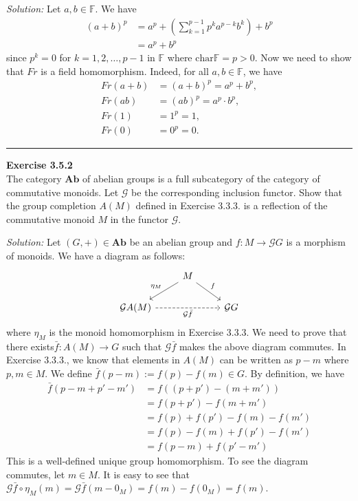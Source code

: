 \documentclass[a4paper, 12pt]{article}
\newenvironment{problem}[2][Exercise]
    { \begin{mdframed}[backgroundcolor=gray!20] \textbf{#1 #2} \\}
    {  \end{mdframed}}
\newenvironment{solution}
    {\textit{Solution:}}
    {}
\begin{document}
\begin{solution}
Let \(a,b\in \mathbb{F}\). We have 
\begin{align*}
	(a+b)^p & =a^p+(\sum_{k=1}^{p-1}p^k a^{p-k}b^k)+b^p\\ 
	        & =a^p+b^p
\end{align*}
since \(p^k=0\) for \(k=1,2,\ldots,p-1\) in \(\mathbb{F}\) where \(\text{char}\mathbb{F}=p>0\). Now we need to show that \(Fr\) is a field homomorphism. Indeed, for all \(a,b\in \mathbb{F}\), we have 
\begin{align*}
	Fr(a+b) & =(a+b)^p=a^p+b^p, \\ 
	Fr(ab) & =(ab)^p=a^p\cdot b^p, \\ 
	Fr(1) & =1^p=1, \\ 
	Fr(0) & =0^p=0. 
\end{align*}

\end{solution}

\noindent\rule{7in}{2.8pt}
\begin{problem}{3.5.2}
The category \(\mathbf{Ab}\) of abelian groups is a full subcategory of the category of commutative monoids. Let \(\mathcal{G}\) be the corresponding inclusion functor. Show that 
the group completion \(A(M)\) defined in Exercise 3.3.3. is a reflection of the commutative monoid \(M\) in the functor \(\mathcal{G}\).
\end{problem}
\begin{solution}
Let \((G,+)\in \mathbf{Ab}\) be an abelian group and \(f:M\rightarrow \mathcal{G}G\) is a morphism of monoids. We have a diagram as follows:
$$\begin{tikzcd}
	& M \\
	{\mathcal{G}A(M)} && {\mathcal{G}G}
	\arrow["{\eta_M}"', from=1-2, to=2-1]
	\arrow["f", from=1-2, to=2-3]
	\arrow["{\mathcal{G}\bar{f}}"', dashed, from=2-1, to=2-3]
\end{tikzcd}$$
where \(\eta_M\) is the monoid homomorphism in Exercise 3.3.3. We need to prove that there exists\(\bar{f}:A(M)\rightarrow G\) such that \(\mathcal{G}\bar{f}\) makes the above diagram commutes. 
In Exercise 3.3.3., we know that elements in \(A(M)\) can be written as \(p-m\) where \(p,m\in M\). We define \(\bar{f}(p-m):=f(p)-f(m)\in G\). By definition, we have 
\begin{align*}
	\bar{f}(p-m+p'-m') & =f((p+p')-(m+m'))\\ 
	             & =f(p+p')-f(m+m')\\ 
				 & =f(p)+f(p')-f(m)-f(m')\\ 
				 & =f(p)-f(m)+f(p')-f(m')\\ 
				 & =f(p-m)+f(p'-m')
\end{align*}
This is a well-defined unique group homomorphism. To see the diagram commutes, let \(m\in M\). It is easy to see that \(\mathcal{G}\bar{f}\circ \eta_M(m)=\mathcal{G}\bar{f}(m-0_M)=f(m)-f(0_M)=f(m)\).
\end{solution}
\end{document}
